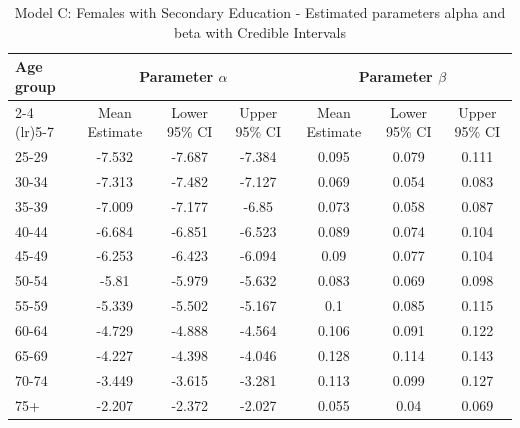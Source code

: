 \begin{landscape}
\begin{table}[htbp]
\centering
\caption{Model C: Females with Secondary Education - Estimated parameters alpha and beta  with Credible Intervals}
\label{tab:parameters_ab19}
\begin{tabular}{@{}lcccccc@{}}
\toprule
Age group & \multicolumn{3}{c}{Parameter \(\alpha\)} & \multicolumn{3}{c}{Parameter \(\beta\)} \\ 
\cmidrule(lr){2-4} \cmidrule(lr){5-7}
          & Mean Estimate & Lower 95\% CI & Upper 95\% CI & Mean Estimate & Lower 95\% CI & Upper 95\% CI \\ 
\midrule
25-29 & -7.532 & -7.687 & -7.384 & 0.095 & 0.079 & 0.111 \\
30-34 & -7.313 & -7.482 & -7.127 & 0.069 & 0.054 & 0.083 \\
35-39 & -7.009 & -7.177 & -6.85 & 0.073 & 0.058 & 0.087 \\
40-44 & -6.684 & -6.851 & -6.523 & 0.089 & 0.074 & 0.104 \\
45-49 & -6.253 & -6.423 & -6.094 & 0.09 & 0.077 & 0.104 \\
50-54 & -5.81 & -5.979 & -5.632 & 0.083 & 0.069 & 0.098 \\
55-59 & -5.339 & -5.502 & -5.167 & 0.1 & 0.085 & 0.115 \\
60-64 & -4.729 & -4.888 & -4.564 & 0.106 & 0.091 & 0.122 \\
65-69 & -4.227 & -4.398 & -4.046 & 0.128 & 0.114 & 0.143 \\
70-74 & -3.449 & -3.615 & -3.281 & 0.113 & 0.099 & 0.127 \\
75+ & -2.207 & -2.372 & -2.027 & 0.055 & 0.04 & 0.069 \\
\bottomrule
\end{tabular}
\end{table}
\end{landscape}